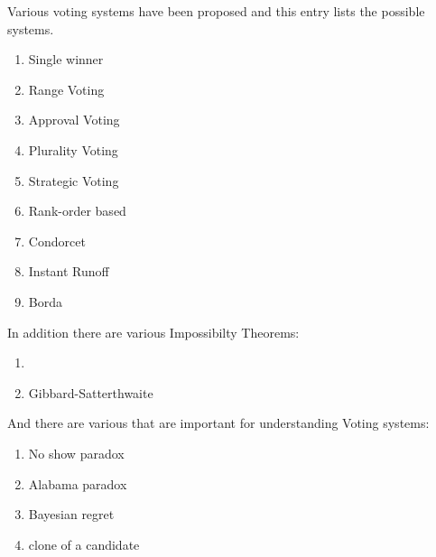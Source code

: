 \documentclass[12pt]{article}
\begin{document}
Various voting systems have been proposed and this entry lists the 
possible systems. 
\begin{enumerate}
\item
Single winner
\item
Range Voting
\item
Approval Voting
\item
Plurality Voting
\item
Strategic Voting
\item
Rank-order based
\item
Condorcet
\item
Instant Runoff
\item
Borda
\end{enumerate}

In addition there are various Impossibilty Theorems:
\begin{enumerate}
\item
{}
\item
Gibbard-Satterthwaite
\end{enumerate}

And there are various  that are important for understanding Voting systems:
\begin{enumerate}
\item
No show paradox
\item
Alabama paradox
\item
Bayesian regret
\item
clone of a candidate
\end{enumerate}
\end{document}
